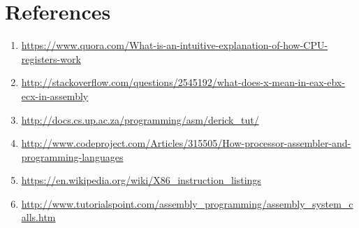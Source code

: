 \documentclass[10pt,a4paper]{book}
\begin{document}
\section{References}
\begin{enumerate}
\item \url{https://www.quora.com/What-is-an-intuitive-explanation-of-how-CPU-registers-work}
\item \url{http://stackoverflow.com/questions/2545192/what-does-x-mean-in-eax-ebx-ecx-in-assembly}
\item \url{http://docs.cs.up.ac.za/programming/asm/derick_tut/}
\item \url{http://www.codeproject.com/Articles/315505/How-processor-assembler-and-programming-languages}
\item \url{https://en.wikipedia.org/wiki/X86_instruction_listings}
\item \url{http://www.tutorialspoint.com/assembly_programming/assembly_system_calls.htm}
\end{enumerate}
\end{document}

